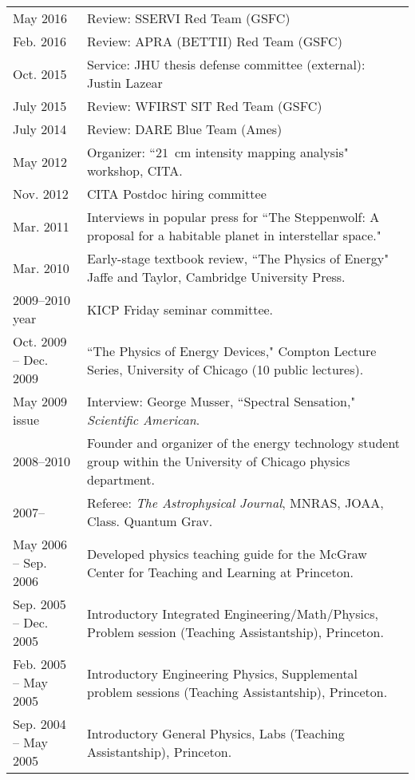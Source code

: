 {\begin{tabular}{l p{12cm}}
May 2016 & Review: SSERVI Red Team (GSFC) \\
Feb. 2016 & Review: APRA (BETTII) Red Team (GSFC) \\
Oct. 2015 & Service: JHU thesis defense committee (external): Justin Lazear \\
July 2015 & Review: WFIRST SIT Red Team (GSFC) \\
July 2014 & Review: DARE Blue Team (Ames) \\
May 2012 & Organizer: ``$21$~cm intensity mapping analysis" workshop, CITA. \\
Nov. 2012 & CITA Postdoc hiring committee \\
Mar. 2011 & Interviews in popular press for ``The Steppenwolf: A proposal for a habitable planet in interstellar space." \\
Mar. 2010  & Early-stage textbook review, ``The Physics of Energy" Jaffe and Taylor, Cambridge University Press. \\
2009--2010 year & KICP Friday seminar committee. \\
Oct. 2009 -- Dec. 2009 & ``The Physics of Energy Devices," Compton Lecture Series, University of Chicago (10 public lectures). \\
May 2009 issue & Interview: George Musser, ``Spectral Sensation," {\it Scientific American}. \\
2008--2010     & Founder and organizer of the energy technology student group within the University of Chicago physics department. \\
2007--         & Referee: {\it The Astrophysical Journal}, MNRAS, JOAA, Class. Quantum Grav. \\
May 2006 -- Sep. 2006 & Developed physics teaching guide for the McGraw Center for Teaching and Learning at Princeton. \\
Sep. 2005 -- Dec. 2005 & Introductory Integrated Engineering/Math/Physics, Problem session (Teaching Assistantship), Princeton. \\ %
Feb. 2005 -- May 2005 & Introductory Engineering Physics, Supplemental problem sessions (Teaching Assistantship), Princeton. \\ %
Sep. 2004 -- May 2005 & Introductory General Physics, Labs (Teaching Assistantship), Princeton. \\ %
\end{tabular} \\~\\~\\
}

